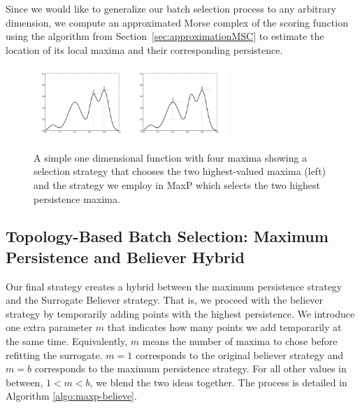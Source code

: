 Since we would like to generalize our batch selection process to any arbitrary dimension, we compute an approximated Morse complex of the scoring function using the algorithm from Section~\ref{sec:approximationMSC} to estimate the location of its local maxima and their corresponding persistence.

\begin{figure}[!ht]
\centering
\includegraphics[width=0.32\textwidth]{figs/chap5/persistence}
\includegraphics[width=0.32\textwidth]{figs/chap5/persistence2}
\caption{A simple one dimensional function with four maxima showing a selection strategy that chooses the two highest-valued maxima (left) and the strategy we employ in MaxP which selects the two highest persistence maxima.}
\label{fig:persistence}
\end{figure}

\subsection{Topology-Based Batch Selection: Maximum Persistence and Believer Hybrid}
Our final strategy creates a hybrid between the maximum persistence strategy and the Surrogate Believer strategy.
%
That is, we proceed with the believer strategy by temporarily adding points with the highest persistence.
%
We introduce one extra parameter $m$ that indicates how many points we add temporarily at the same time.
%
Equivalently, $m$ means the number of maxima to chose before refitting the surrogate.
%
$m=1$ corresponds to the original believer strategy and $m = b$ corresponds to the maximum persistence strategy.
%
For all other values in between, $1 < m < b$, we blend the two ideas together.
%
The process is detailed in Algorithm \ref{algo:maxp-believe}.

